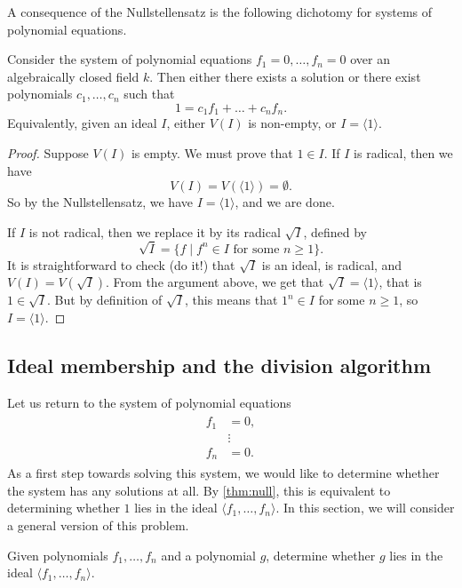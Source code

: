 \documentclass[11pt]{article}
\begin{document}
A consequence of the Nullstellensatz is the following dichotomy for systems of polynomial equations.
\begin{theorem}\label{thm:null}
  Consider the system of polynomial equations $f_1 = 0, \dots, f_n = 0$ over an algebraically closed field $k$.
  Then either there exists a solution or there exist polynomials $c_1, \dots, c_n$ such that
  \[ 1 = c_1 f_1 + \dots + c_nf_n.\]
  Equivalently, given an ideal $I$, either $V(I)$ is non-empty, or $I = \langle  1 \rangle$.
\end{theorem}
\begin{proof}
  Suppose $V(I)$ is empty.
  We must prove that $1 \in I$.
  If $I$ is radical, then we have
  \[ V(I) = V(\langle 1 \rangle) = \emptyset.\]
  So by the Nullstellensatz, we have $I = \langle  1 \rangle$, and we are done.

  If $I$ is not radical, then we replace it by its radical $\sqrt I$, defined by
  \[ \sqrt I = \{f \mid f^n \in I \text{ for some $n \geq 1$}\}.\]
  It is straightforward to check (do it!) that $\sqrt I$ is an ideal, is radical, and $V(I) = V(\sqrt I)$.
  From the argument above, we get that $\sqrt I = \langle  1 \rangle$, that is $1 \in \sqrt I$.
  But by definition of $\sqrt I$, this means that $1^n \in I$ for some $n \geq 1$, so $I = \langle  1 \rangle$.
\end{proof}

\subsection{Ideal membership and the division algorithm}
Let us return to the system of polynomial equations
\begin{align}\label{eqn:system1}
  \begin{split}
  f_1 &= 0,\\
  &\vdots\\
  f_n &= 0.
\end{split}
\end{align}
As a first step towards solving this system, we would like to determine whether the system has any solutions at all.
By \autoref{thm:null}, this is equivalent to determining whether $1$ lies in the ideal $\langle  f_1, \dots, f_n \rangle$.
In this section, we will consider a general version of this problem.
\begin{problem}
  Given polynomials $f_1, \dots, f_n$ and a polynomial $g$, determine whether $g$ lies in the ideal $\langle  f_1, \dots, f_n \rangle$.
\end{problem}
\end{document}
